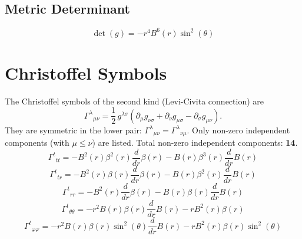 \documentclass[11pt,a4paper]{article}
\newcommand{\christoffel}[3]{\Gamma^{#1}{}_{#2 #3}}
\begin{document}
\subsection{Metric Determinant}
\begin{dmath*}
  \det(g) = - r^{4} B^{6}{\left(r \right)} \sin^{2}{\left(\theta \right)}
\end{dmath*}
\section{Christoffel Symbols}
The Christoffel symbols of the second kind (Levi-Civita connection) are
\begin{equation}
  \christoffel{\lambda}{\mu}{\nu} = \frac{1}{2}\,g^{\lambda\sigma}\!\left(\partial_\mu g_{\nu\sigma} + \partial_\nu g_{\mu\sigma}- \partial_\sigma g_{\mu\nu}\right).
\end{equation}
They are symmetric in the lower pair: $\christoffel{\lambda}{\mu}{\nu} = \christoffel{\lambda}{\nu}{\mu}$. Only non-zero independent components (with $\mu \le \nu$) are listed.
Total non-zero independent components: \textbf{14}.
\begin{dmath*}
  \christoffel{t}{t}{t} = - B^{2}{\left(r \right)} \beta^{2}{\left(r \right)} \frac{d}{d r} \beta{\left(r \right)} - B{\left(r \right)} \beta^{3}{\left(r \right)} \frac{d}{d r} B{\left(r \right)}
\end{dmath*}
\begin{dmath*}
  \christoffel{t}{t}{r} = - B^{2}{\left(r \right)} \beta{\left(r \right)} \frac{d}{d r} \beta{\left(r \right)} - B{\left(r \right)} \beta^{2}{\left(r \right)} \frac{d}{d r} B{\left(r \right)}
\end{dmath*}
\begin{dmath*}
  \christoffel{t}{r}{r} = - B^{2}{\left(r \right)} \frac{d}{d r} \beta{\left(r \right)} - B{\left(r \right)} \beta{\left(r \right)} \frac{d}{d r} B{\left(r \right)}
\end{dmath*}
\begin{dmath*}
  \christoffel{t}{\theta}{\theta} = - r^{2} B{\left(r \right)} \beta{\left(r \right)} \frac{d}{d r} B{\left(r \right)} - r B^{2}{\left(r \right)} \beta{\left(r \right)}
\end{dmath*}
\begin{dmath*}
  \christoffel{t}{\varphi}{\varphi} = - r^{2} B{\left(r \right)} \beta{\left(r \right)} \sin^{2}{\left(\theta \right)} \frac{d}{d r} B{\left(r \right)} - r B^{2}{\left(r \right)} \beta{\left(r \right)} \sin^{2}{\left(\theta \right)}
\end{dmath*}
\end{document}
